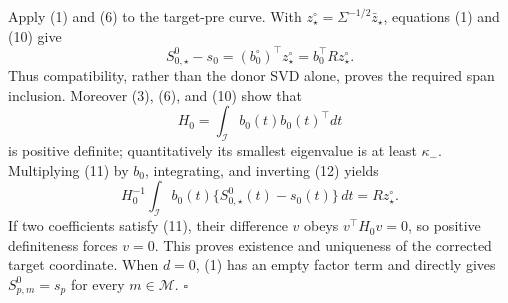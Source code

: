 Apply (1) and (6) to the target-pre curve.  With
\(z_\star^\circ=\Sigma^{-1/2}\bar z_\star\), equations (1) and (10)
give
\[
 S^0_{0,\star}-s_0=(b_0^\circ)^\top z_\star^\circ
                   =b_0^\top Rz_\star^\circ.              \tag{11}
\]
Thus compatibility, rather than the donor SVD alone, proves the required
span inclusion.  Moreover (3), (6), and (10) show that
\[
 H_0=\int_{\mathcal I}b_0(t)b_0(t)^\top dt                 \tag{12}
\]
is positive definite; quantitatively its smallest eigenvalue is at least
\(\kappa_-\).  Multiplying (11) by \(b_0\), integrating, and inverting
(12) yields
\[
 H_0^{-1}\int_{\mathcal I}b_0(t)
  \{S^0_{0,\star}(t)-s_0(t)\}\,dt=Rz_\star^\circ.          \tag{13}
\]
If two coefficients satisfy (11), their difference \(v\) obeys
\(v^\top H_0v=0\), so positive definiteness forces \(v=0\).  This proves
existence and uniqueness of the corrected target coordinate.  When
\(d=0\), (1) has an empty factor term and directly gives
\(S^0_{p,m}=s_p\) for every \(m\in\mathcal M\). \(\square\)